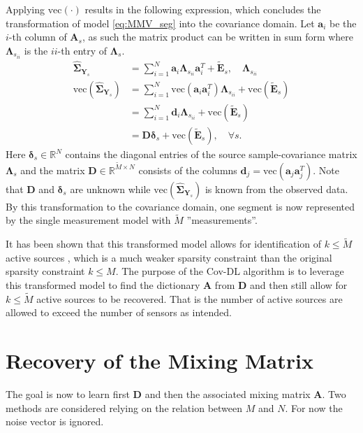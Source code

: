 Applying $\text{vec}(\cdot)$ results in the following expression, which concludes the transformation of model \eqref{eq:MMV_seg} into the covariance domain. 
Let $\textbf{a}_i$ be the $i$-th column of $\textbf{A}_s$, as such the matrix product can be written in sum form where $\boldsymbol{\Lambda}_{s_{ii}}$ is the $ii$-th entry of $\boldsymbol{\Lambda}_s$.  
\begin{align}
\widehat{\boldsymbol{\Sigma}}_{\mathbf{Y}_s} &= \sum_{i=1}^{N} \textbf{a}_i \boldsymbol{\Lambda}_{s_{ii}} \textbf{a}_i^{T} + \widetilde{\textbf{E}}_s, \quad \boldsymbol{\Lambda}_{s_{ii}} \nonumber \\
\text{vec}\left( \widehat{\boldsymbol{\Sigma}}_{\mathbf{Y}_s} \right) &= \sum_{i=1}^N \text{vec}(\mathbf{a}_i \mathbf{a}_i^T) \boldsymbol{\Lambda}_{s_{ii}} + \text{vec}( \widetilde{\textbf{E}}_s) \nonumber \\
&= \sum_{i=1}^N \mathbf{d}_i \boldsymbol{\Lambda}_{s_{ii}} + \text{vec}( \widetilde{\textbf{E}}_s) \nonumber \\
&= \mathbf{D} \boldsymbol{\delta}_s + \text{vec}( \widetilde{\textbf{E}}_s), \quad \forall s. \label{eq:cov1}
\end{align}
Here $\boldsymbol{\delta}_s \in \mathbb{R}^{N}$ contains the diagonal entries of the source sample-covariance matrix $\boldsymbol{\Lambda}_s$
and the matrix $\mathbf{D} \in \mathbb{R}^{\widetilde{M} \times N}$ consists of the columns $\mathbf{d}_j = \text{vec}(\mathbf{a}_j \mathbf{a}_j^T)$. Note that $\mathbf{D}$ and $\boldsymbol{\delta}_s$ are unknown while $\text{vec}\left( \widehat{\boldsymbol{\Sigma}}_{\mathbf{Y}_s} \right)$ is known from the observed data.
By this transformation to the covariance domain, one segment is now represented by the single measurement model with $\widetilde{M}$ ''measurements''. 

It has been shown that this transformed model allows for identification of $k \leq \widetilde{M}$ active sources \cite{Pal2015}, which is a much weaker sparsity constraint than the original sparsity constraint $k \leq M$. 
The purpose of the Cov-DL algorithm is to leverage this transformed model to find the dictionary $\mathbf{A}$ from $\mathbf{D}$ and then still allow for $k \leq \widetilde{M}$ active sources to be recovered. 
That is the number of active sources are allowed to exceed the number of sensors as intended.

\section{Recovery of the Mixing Matrix}
The goal is now to learn first $\textbf{D}$ and then the associated mixing matrix $\textbf{A}$. 
Two methods are considered relying on the relation between $M$ and $N$. 
For now the noise vector is ignored.



